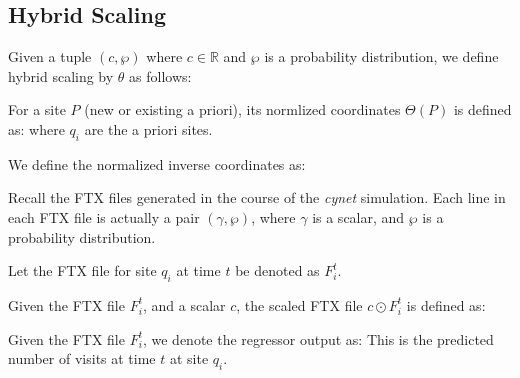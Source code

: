 \documentclass[onecolumn, compsoc,10pt]{IEEEtran}
\begin{document}
\subsection{Hybrid Scaling}

\begin{defn}
Given a tuple $(c,\wp)$ where $c \in \mathbb{R}$ and $\wp$ is a probability distribution, we define hybrid scaling by $\theta$ as follows:
\end{defn}

\begin{defn}
For a  site $P$ (new or existing a priori), its normlized coordinates $\Theta(P)$ is defined as:
where $q_i$ are the a priori sites.
\end{defn}

\begin{defn}
We define the normalized inverse coordinates as:
\end{defn}

Recall the FTX files generated in the course of the \textit{cynet} simulation.
Each line in each FTX file is actually a pair $(\gamma,\wp)$, where $\gamma$ is a scalar, and $\wp $ is a probability distribution.

\begin{notn}
Let the FTX file for site $q_i$ at time $t$ be denoted as $F_i^t$.
\end{notn}

\begin{defn}
Given the FTX file $F_i^t$, and a scalar $c$, the scaled FTX file $c \odot F_i^t$ is defined as:
\end{defn}
\begin{notn}
Given the FTX file $F_i^t$, we denote the regressor output as:
This is the predicted number of visits at time $t$ at site $q_i$.
\end{notn}
\end{document}

